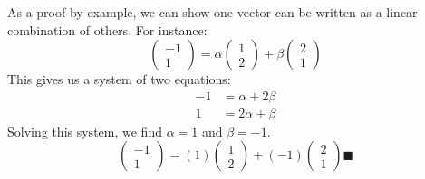 \documentclass{article}
\begin{document}
As a proof by example, we can show one vector can be written as a linear combination of others. For instance:
$$ \begin{pmatrix} -1 \\ 1 \end{pmatrix} = \alpha \begin{pmatrix} 1 \\ 2 \end{pmatrix} + \beta \begin{pmatrix} 2 \\ 1 \end{pmatrix} $$
This gives us a system of two equations:
\begin{align*} -1 &= \alpha + 2\beta \\ 1 &= 2\alpha + \beta \end{align*}
Solving this system, we find $\alpha = 1$ and $\beta = -1$.
$$ \begin{pmatrix} -1 \\ 1 \end{pmatrix} = (1) \begin{pmatrix} 1 \\ 2 \end{pmatrix} + (-1) \begin{pmatrix} 2 \\ 1 \end{pmatrix} 
\blacksquare$$
\end{document}
